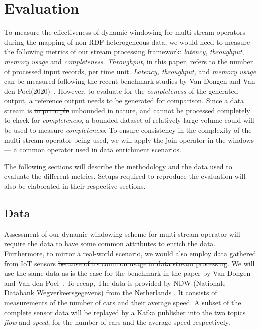 \chapter{Evaluation}

To measure the effectiveness of dynamic windowing for multi-stream operators during the 
mapping of non-RDF heterogeneous data, we would need to measure the following 
metrics of our stream processing framework: \emph{latency}, \emph{throughput},
\emph{memory usage} and \emph{completeness}. \emph{Throughput}, in this 
paper, refers to the number of processed input records, per time unit.
\emph{Latency, throughput,} and \emph{memory usage} can be measured following the recent benchmark studies by 
Van Dongen and Van den Poel(2020)~\cite{evalution_of_spe}.
However, to evaluate 
for the \emph{completeness}
of the generated output, a reference output needs 
to be generated for comparison. Since a data stream is \sout{in principle} unbounded in nature, 
and cannot be processed completely to check for \emph{completeness}, a bounded 
dataset of relatively large volume \sout{could} will be used to measure \emph{completeness}.
To ensure consistency in the complexity of the multi-stream operator being used, 
we will apply the join operator in the windows --- a common operator used in 
data enrichment scenarios. 


The following sections will describe the methodology and the data used to evaluate the
different metrics. Setups required to reproduce the evaluation will also be elaborated 
in their respective sections. 


\section{Data}

Assessment of our dynamic windowing scheme for multi-stream operator will require 
the data to have some common attributes to enrich the data. Furthermore, to 
mirror a real-world scenario, we would also employ data gathered from IoT sensors
\sout{because of its common usage in data stream processing}.
We will use the same data 
as is the case for the benchmark in the paper by Van Dongen and Van den Poel~\cite{evalution_of_spe}. 
\sout{To recap,} The data is provided by NDW (Nationale Databank Wegverkeersgegevens) from the 
Netherlands . It consists of measurements of the number of cars and their average speed. 
A subset of the complete sensor data will be replayed by a Kafka publisher into the two topics 
\emph{flow} and \emph{speed}, for the number of cars and the average speed respectively. 

